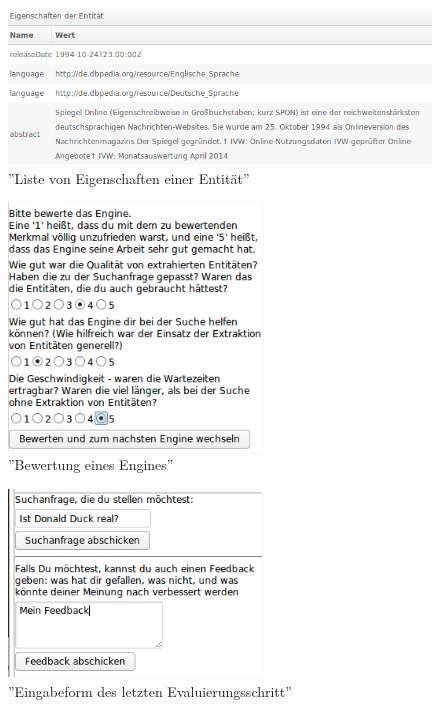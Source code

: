 \begin{figure}
\centering
\includegraphics[width=1\textwidth]{Bilder/eval-step03.png}
\caption{''Liste von Eigenschaften einer Entität''}
\label{fig:eval-props}
\end{figure}

\begin{figure}
\centering
\includegraphics[width=0.6\textwidth]{Bilder/bewertung-eval.png}
\caption{''Bewertung eines Engines''}
\label{fig:bewertung}
\end{figure}

\begin{figure}
\centering
\includegraphics[width=0.6\textwidth]{Bilder/ende-eval-01.png}
\caption{''Eingabeform des letzten Evaluierungsschritt''}
\label{fig:finish-eval}
\end{figure}
